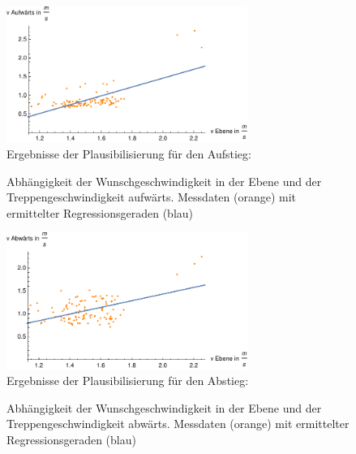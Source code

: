 \begin{figure}[htpb]
\centering
\includegraphics[width=0.7\textwidth]{abbildungen/regression/2012_2017_verbund/auf-ebene.pdf}
\justify \ \\
Ergebnisse der Plausibilisierung für den Aufstieg:

\caption{Abhängigkeit der Wunschgeschwindigkeit in der Ebene und der Treppengeschwindigkeit aufwärts. Messdaten (orange) mit ermittelter Regressionsgeraden (blau)}
\label{fig:2012_und_2017_MA_auf_ebene}
\end{figure}

\begin{figure}[htpb]
\centering
\includegraphics[width=0.7\textwidth]{abbildungen/regression/2012_2017_verbund/ab-ebene.pdf}
\justify \ \\
Ergebnisse der Plausibilisierung für den Abstieg:

\caption{Abhängigkeit der Wunschgeschwindigkeit in der Ebene und der Treppengeschwindigkeit abwärts. Messdaten (orange) mit ermittelter Regressionsgeraden (blau)}
\label{fig:2012_und_2017_MA_ab_ebene}
\end{figure}

